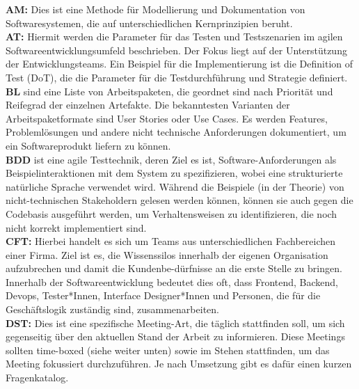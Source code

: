 \textbf{AM:} Dies ist eine Methode für Modellierung und Dokumentation von Softwaresystemen, die auf unterschiedlichen Kernprinzipien beruht.\cite{Ambler2010-te} \\

\textbf{AT:} Hiermit werden die Parameter für das Testen und Testszenarien im agilen Softwareentwicklungsumfeld beschrieben. Der Fokus liegt auf der Unterstützung der Entwicklungsteams. 
Ein Beispiel für die Implementierung ist die Definition of Test (DoT), die die Parameter für die Testdurchführung und Strategie definiert. \cite{Crispin2009} \\

\textbf{BL} sind eine Liste von Arbeitspaketen, die geordnet sind nach Priorität und Reifegrad der einzelnen Artefakte. Die bekanntesten Varianten der Arbeitspaketformate sind User Stories oder Use Cases. 
Es werden Features, Problemlösungen und andere nicht technische Anforderungen dokumentiert, um ein Softwareprodukt liefern zu können.\cite{Svensson2019-pq} \\

\textbf{BDD} ist eine agile Testtechnik, deren Ziel es ist, Software-Anforderungen als Beispielinteraktionen mit dem System zu spezifizieren,
wobei eine strukturierte natürliche Sprache verwendet wird. Während die Beispiele (in der Theorie) von nicht-technischen Stakeholdern gelesen werden können, 
können sie auch gegen die Codebasis ausgeführt werden, um Verhaltensweisen zu identifizieren, die noch nicht korrekt implementiert sind. \cite{Binamungu2020-wt} \\

\textbf{CFT:} Hierbei handelt es sich um Teams aus unterschiedlichen Fachbereichen einer Firma. Ziel ist es, die Wissenssilos innerhalb der eigenen Organisation aufzubrechen und damit die Kundenbe-dürfnisse an die erste Stelle zu bringen. 
Innerhalb der Softwareentwicklung bedeutet dies oft, dass Frontend, Backend, Devops, Tester*Innen, Interface Designer*Innen und Personen, die für die Geschäftslogik zuständig sind, zusammenarbeiten.\cite{McDonough2000-fi} \\

\textbf{DST:} Dies ist eine spezifische Meeting-Art, die täglich stattfinden soll, um sich gegenseitig über den aktuellen Stand der Arbeit zu informieren. 
Diese Meetings sollten time-boxed (siehe weiter unten) sowie im Stehen stattfinden, um das Meeting fokussiert durchzuführen. Je nach Umsetzung gibt es dafür einen kurzen Fragenkatalog.\cite{Stray2016-me} \\

